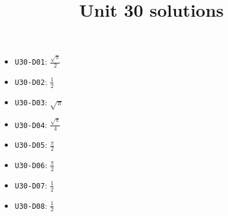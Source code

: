\title{Unit 30 solutions}\maketitle\begin{itemize}
  \item \texttt{U30-D01}: $\frac{\sqrt{\pi}}{2}$
  \item \texttt{U30-D02}: $\frac{1}{2}$
  \item \texttt{U30-D03}: $\sqrt{\pi}$
  \item \texttt{U30-D04}: $\frac{\sqrt{\pi}}{4}$
  \item \texttt{U30-D05}: $\frac{\pi}{2}$
  \item \texttt{U30-D06}: $\frac{\pi}{2}$
  \item \texttt{U30-D07}: $\frac{1}{2}$
  \item \texttt{U30-D08}: $\frac{1}{2}$
\end{itemize}
